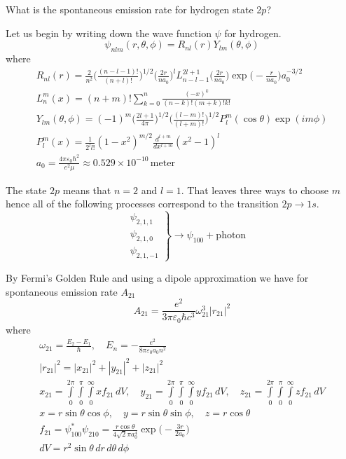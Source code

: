 \documentclass[12pt]{article}
\begin{document}
What is the spontaneous emission rate for hydrogen state 2$p$?

\bigskip
Let us begin by writing down the wave function $\psi$ for hydrogen.
\begin{equation*}
\psi_{nlm}(r,\theta,\phi)=R_{nl}(r)Y_{lm}(\theta,\phi)
\end{equation*}
where
\begin{gather*}
R_{nl}(r)=
\frac{2}{n^2}
\bigg(\frac{(n-l-1)!}{(n+l)!}\bigg)^{1/2}
\bigg(\frac{2r}{na_0}\bigg)^l
L_{n-l-1}^{2l+1}\bigg(\frac{2r}{na_0}\bigg)
\exp\bigg({-}\frac{r}{na_0}\bigg)
a_0^{-3/2}
\\
L_n^m(x)=(n+m)!\sum_{k=0}^n\frac{(-x)^k}{(n-k)!(m+k)!k!}
\\
Y_{lm}(\theta,\phi)=(-1)^m
\bigg(\frac{2l+1}{4\pi}\bigg)^{1/2}
\bigg(\frac{(l-m)!}{(l+m)!}\bigg)^{1/2}
P_l^m(\cos\theta)\exp(im\phi)
\\
P_l^m(x)=\frac{1}{2^l l!}(1-x^2)^{m/2}\frac{d^{l+m}}{dx^{l+m}}(x^2-1)^l
\\
a_0=\frac{4\pi\varepsilon_0\hbar^2}{e^2\mu}\approx0.529\times10^{-10}\,\text{meter}
\end{gather*}

The state $2p$ means that $n=2$ and $l=1$.
That leaves three ways to choose $m$ hence all of the following processes correspond to the transition
$2p\rightarrow1s$.
\begin{equation*}
\left.\begin{aligned}
&\psi_{2,1,1}
\\
&\psi_{2,1,0}
\\
&\psi_{2,1,-1}
\end{aligned}\right\}\rightarrow\psi_{100}+\text{photon}
\end{equation*}

By Fermi's Golden Rule and using a dipole approximation we have
for spontaneous emission rate $A_{21}$
\begin{equation*}
A_{21}=\frac{e^2}{3\pi\varepsilon_0\hbar c^3}\omega_{21}^3|r_{21}|^2
\tag{1}
\end{equation*}
where
\begin{gather*}
\omega_{21}=\frac{E_2-E_1}{\hbar},\quad E_n=-\frac{e^2}{8\pi\varepsilon_0a_0n^2}
\\
|r_{21}|^2=|x_{21}|^2+|y_{21}|^2+|z_{21}|^2
\\
x_{21}=\int\limits_{0}^{2\pi}\int\limits_{0}^{\pi}\int\limits_{0}^{\infty}xf_{21}\,dV,
\quad
y_{21}=\int\limits_{0}^{2\pi}\int\limits_{0}^{\pi}\int\limits_{0}^{\infty}yf_{21}\,dV,
\quad
z_{21}=\int\limits_{0}^{2\pi}\int\limits_{0}^{\pi}\int\limits_{0}^{\infty}zf_{21}\,dV
\\
x=r\sin\theta\cos\phi,
\quad
y=r\sin\theta\sin\phi,
\quad
z=r\cos\theta
\\
f_{21}=\psi_{100}^*\psi_{210}=\frac{r\cos\theta}{4\sqrt2\pi a_0^4}\exp\bigg({-}\frac{3r}{2a_0}\bigg)
\\
dV=r^2\sin\theta\,dr\,d\theta\,d\phi
\end{gather*}
\end{document}
